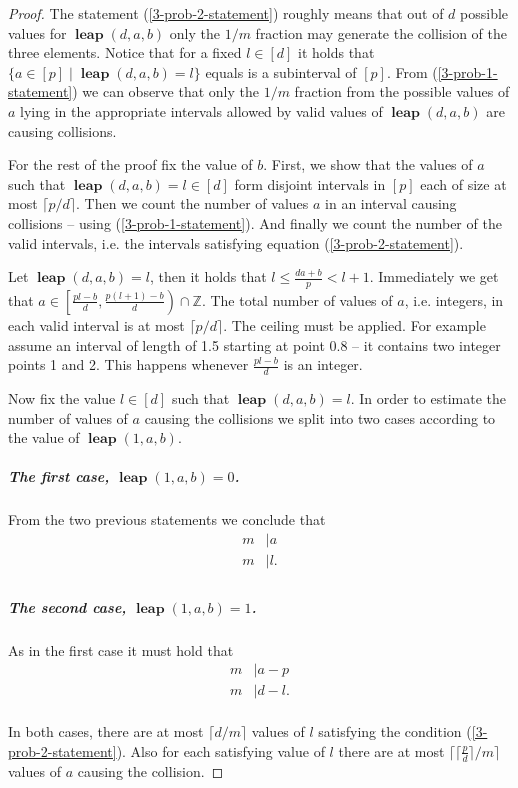 \documentclass{article}
\newcommand{\leap}[3]{\operatorname{\mathbf{leap}}({#1}, {#2}, {#3})}
\begin{document}
\begin{proof}
The statement (\ref{3-prob-2-statement}) roughly means that out of $d$ possible values for $\leap{d}{a}{b}$ only the $1 / m$ fraction may generate the collision of the three elements. Notice that for a fixed $l \in [d]$ it holds that $\{a \in [p] \mid \leap{d}{a}{b} = l\}$ equals is a subinterval of $[p]$.
From (\ref{3-prob-1-statement}) we can observe that only the $1 / m$ fraction from the possible values of $a$ lying in the appropriate intervals allowed by valid values of $\leap{d}{a}{b}$ are causing collisions.

For the rest of the proof fix the value of $b$. 
First, we show that the values of $a$ such that $\leap{d}{a}{b} = l \in [d]$ form disjoint intervals in $[p]$ each of size at most $\lceil p/d \rceil$.
Then we count the number of values $a$ in an interval causing collisions -- using (\ref{3-prob-1-statement}).
And finally we count the number of the valid intervals, i.e. the intervals satisfying equation (\ref{3-prob-2-statement}).

Let $\leap{d}{a}{b} = l$, then it holds that $l \leq \frac{da + b}{p} < l + 1$. Immediately we get that $a \in \left[\frac{pl - b}{d}, \frac{p(l + 1) - b}{d}\right) \cap \mathbb{Z}$. The total number of values of $a$, i.e. integers, in each valid interval is at most $\lceil p / d \rceil$. The ceiling must be applied. For example assume an interval of length of 1.5 starting at point 0.8 -- it contains two integer points 1 and 2. This happens whenever $\frac{pl - b}{d}$ is an integer.

Now fix the value $l \in [d]$ such that $\leap{d}{a}{b} = l$.
In order to estimate the number of values of $a$ causing the collisions we split into two cases according to the value of $\leap{1}{a}{b}$.

\subparagraph{The first case, $\leap{1}{a}{b} = 0$.} 
From the two previous statements we conclude that
\begin{align*}
	m & \mid a \\
	m & \mid l. \\
\end{align*}

\subparagraph{The second case, $\leap{1}{a}{b} = 1$.}
As in the first case it must hold that
\begin{align*}
	m & \mid a - p \\
	m & \mid d - l. \\
\end{align*}

In both cases, there are at most $\lceil d/m \rceil$ values of $l$ satisfying the  condition (\ref{3-prob-2-statement}).
Also for each satisfying value of $l$ there are at most $\lceil \lceil\frac{p}{d}\rceil / m \rceil$ values of $a$ causing the collision.

\end{proof}
\end{document}
